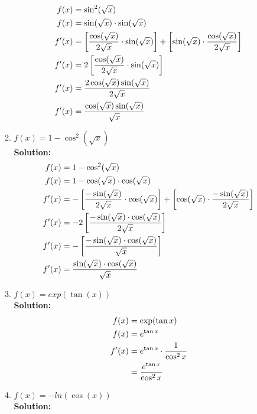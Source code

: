 \documentclass[a4paper]{article}
\begin{document}
\begin{enumerate}
\begin{enumerate}
{{}}

\begin{align}
	f(x) &= \sin^2 (\sqrt{x})\notag\\
	f(x) &= \sin(\sqrt{x}) \cdot \sin(\sqrt{x})\notag\\
	f'(x) &= \left[ \frac{\cos(\sqrt{x})}{2\sqrt{x} } \cdot \sin(\sqrt{x})\right] + \left[ \sin(\sqrt{x}) \cdot \frac{\cos(\sqrt{x})}{2\sqrt{x}}\right]\notag\\
	f'(x) &= 2\left[ \frac{\cos(\sqrt{x})}{2\sqrt{x} } \cdot \sin(\sqrt{x})\right]\notag\\
	f'(x) &= \frac{2 \cos(\sqrt{x}) \sin(\sqrt{x}) }{2\sqrt{x} }\notag\\
	f'(x) &= \frac{\cos(\sqrt{x}) \sin(\sqrt{x}) }{\sqrt{x} }\notag
\end{align}			
	
	
	\item $f(x) = 1 - \cos^2 (\sqrt{x})$\\
	\textbf{Solution:}\\
	
\begin{align}
	f(x) &= 1 - \cos^2 (\sqrt{x})\notag\\
	f(x) &= 1 - \cos(\sqrt{x}) \cdot \cos(\sqrt{x})\notag\\
	f'(x) &=  - \left[  \frac{-\sin(\sqrt{x})}{2\sqrt{x}} \cdot \cos(\sqrt{x})\right] + \left[ \cos(\sqrt{x}) \cdot \frac{-\sin(\sqrt{x})}{2\sqrt{x}}\right]\notag\\
	f'(x) &= - 2\left[ \frac{- \sin(\sqrt{x}) \cdot \cos(\sqrt{x})}{2\sqrt{x}}\right]\notag\\
	f'(x) &= - \left[ \frac{- \sin(\sqrt{x}) \cdot \cos(\sqrt{x})}{\sqrt{x}}\right]\notag\\
	f'(x) &=   \frac{ \sin(\sqrt{x}) \cdot \cos(\sqrt{x})}{\sqrt{x}}\notag
\end{align}		
	
	
	\item $f(x) = exp(\tan(x))$\\
	\textbf{Solution:}\\
	
	
\begin{align*}
 f(x) &= \exp(\tan x)\notag\\
 f(x) &= e^{\tan x}\notag\\
 f'(x) &= e^{\tan x} \cdot \frac{1}{\cos^2 x}\notag\\
 &= \frac{e^{\tan x}}{\cos^2 x}\notag
\end{align*}	
	
	\item $f(x) = -ln(\cos(x))$\\
	\textbf{Solution:}\\
	

\end{enumerate}
\end{enumerate}
\end{document}
